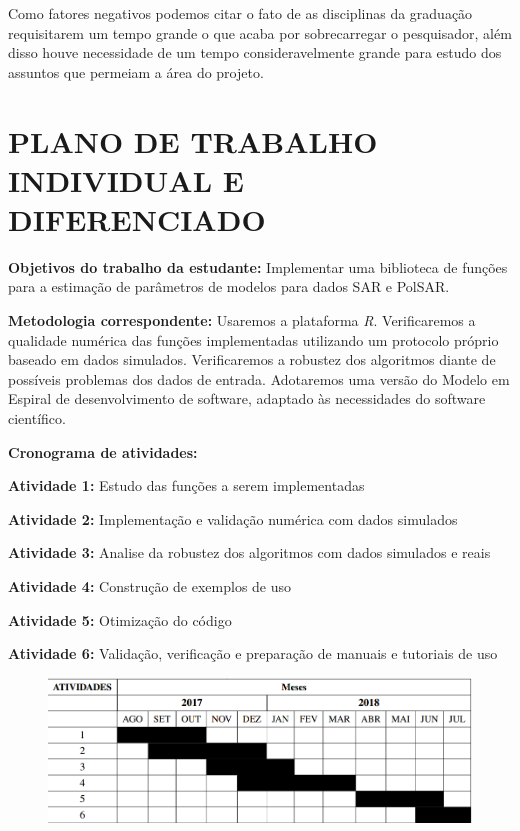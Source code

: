 \documentclass[12pt,letterpaper]{article}
\begin{document}
	Como fatores negativos podemos citar o fato de as disciplinas da graduação
requisitarem um tempo grande o que acaba por sobrecarregar o pesquisador, além disso
houve necessidade de um tempo consideravelmente grande para estudo dos assuntos
que permeiam a área do projeto.



\newpage





\newpage

\section*{\centering \textbf{PLANO DE TRABALHO INDIVIDUAL E DIFERENCIADO}} %

\textbf{Objetivos do trabalho da estudante:} Implementar uma biblioteca de
funções para a estimação de parâmetros de modelos para dados SAR e PolSAR.

\textbf{Metodologia correspondente:} Usaremos a plataforma \textit{R}. Verificaremos a qualidade numérica das funções implementadas utilizando um protocolo próprio baseado em dados simulados. Verificaremos a robustez dos algoritmos diante de possíveis problemas dos dados de entrada. Adotaremos uma versão do Modelo em Espiral de desenvolvimento de software, adaptado às necessidades do software científico.

\textbf{Cronograma de atividades:}

\textbf{Atividade 1:} Estudo das funções a serem implementadas

\textbf{Atividade 2:} Implementação e validação numérica com dados simulados

\textbf{Atividade 3:} Analise da robustez dos algoritmos com dados simulados e reais

\textbf{Atividade 4:} Construção de exemplos de uso

\textbf{Atividade 5:} Otimização do código

\textbf{Atividade 6:} Validação, verificação e preparação de manuais e tutoriais de uso

\begin{figure}[H]
	\begin{center}
		\includegraphics[width=0.95\columnwidth]{cronograma}
	\end{center}
\end{figure}
\end{document}
